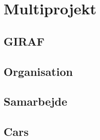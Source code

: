 \section{Multiprojekt}

\subsection{GIRAF}

\subsection{Organisation}

\subsection{Samarbejde}

\subsection{Cars}